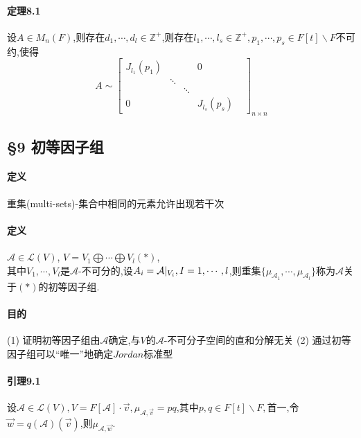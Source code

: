 \documentclass{ctexart}
\begin{document}
\paragraph{定理8.1}
设$A\in M_{n}(F)$,则存在$d_{1},\cdots,d_{l}\in \mathbb{Z}^{+}$,则存在$l_{1},\cdots,l_{s} \in \mathbb{Z}^{+},p_{1},\cdots,p_{s} \in F[t]\backslash F$不可约,使得
$$
 A \sim
 \left[
 \begin{matrix}
  J_{l_{1}}(p_{1}) &   &   & 0 \\
    & \ddots &   &   & \\
     &   & \ddots &   &  \\
  0 &   &    & J_{l_{s}}(p_{s})
  \end{matrix}
  \right]_{n\times n}
$$

\subsection{§9 初等因子组}

\paragraph{定义}

重集(multi-sets)-集合中相同的元素允许出现若干次

\paragraph{定义}

$\mathcal{A} \in \mathcal{L}(V)$,
$V=V_{1}\bigoplus \cdots \bigoplus V_{l} (*)$,\\
其中$V_{1},\cdots,V_{l}$是$\mathcal{A}$-不可分的,设$A_{i}=\mathcal{A}\arrowvert_{V_{i}},I=1,\cdots,l$,则重集$\{ \mu_{\mathcal{A}_{1}},\cdots,\mu_{\mathcal{A}_{l}}\}$称为$\mathcal{A}$关于$(*)$的初等因子组.

\paragraph{目的}

(1) 证明初等因子组由$\mathcal{A}$确定,与$V$的$\mathcal{A}$-不可分子空间的直和分解无关
(2) 通过初等因子组可以“唯一”地确定$Jordan$标准型

\paragraph{引理9.1}

设$\mathcal{A} \in \mathcal{L}(V),V=F[\mathcal{A}] \cdot \vec{v},\mu_{\mathcal{A},\vec{v}}=pq$,其中$p,q \in F[t] \backslash F,$首一,令$\vec{w}=q(\mathcal{A})(\vec{v})$,则$\mu_{\mathcal{A},\vec{w}}$.
\end{document}
